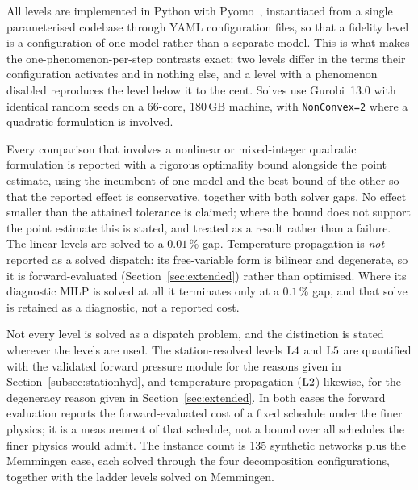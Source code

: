 
All levels are implemented in Python with Pyomo~\cite{pyomo}, instantiated from a single
parameterised codebase through YAML configuration files, so that a fidelity level is a
configuration of one model rather than a separate model. This is what makes the
one-phenomenon-per-step contrasts exact: two levels differ in the terms their configuration
activates and in nothing else, and a level with a phenomenon disabled reproduces the level
below it to the cent. Solves use Gurobi~13.0 with identical random seeds on a 66-core,
180\,GB machine, with \texttt{NonConvex=2} where a quadratic formulation is involved.

Every comparison that involves a nonlinear or mixed-integer quadratic formulation is reported
with a rigorous optimality bound alongside the point estimate, using the incumbent of one model
and the best bound of the other so that the reported effect is conservative, together with both
solver gaps. No effect smaller than the attained tolerance is claimed; where the bound does not
support the point estimate this is stated, and treated as a result rather than a failure. The
linear levels are solved to a $0.01$\,\% gap. Temperature propagation is \emph{not} reported as
a solved dispatch: its free-variable form is bilinear and degenerate, so it is forward-evaluated
(Section~\ref{sec:extended}) rather than optimised. Where its diagnostic MILP is solved at all it
terminates only at a $0.1$\,\% gap, and that solve is retained as a diagnostic, not a reported
cost.

Not every level is solved as a dispatch problem, and the distinction is stated wherever the
levels are used. The station-resolved levels $\mathrm{L4}$ and $\mathrm{L5}$ are quantified with the
validated forward pressure module for the reasons given in
Section~\ref{subsec:stationhyd}, and temperature propagation ($\mathrm{L2}$) likewise, for the
degeneracy reason given in Section~\ref{sec:extended}. In both cases the forward evaluation
reports the forward-evaluated cost of a fixed schedule under the finer physics; it is a
measurement of that schedule, not a bound over all schedules the finer physics would admit. The instance
count is 135 synthetic networks plus the Memmingen case, each solved through the four
decomposition configurations, together with the ladder levels solved on Memmingen.
